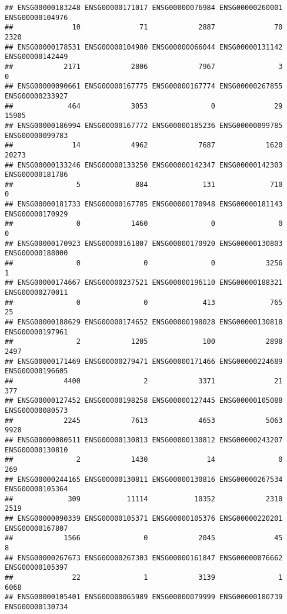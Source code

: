 \documentclass[
]{article}
\begin{document}
\begin{verbatim}
## ENSG00000183248 ENSG00000171017 ENSG00000076984 ENSG00000260001 ENSG00000104976 
##              10              71            2887              70            2320 
## ENSG00000178531 ENSG00000104980 ENSG00000066044 ENSG00000131142 ENSG00000142449 
##            2171            2806            7967               3               0 
## ENSG00000090661 ENSG00000167775 ENSG00000167774 ENSG00000267855 ENSG00000233927 
##             464            3053               0              29           15905 
## ENSG00000186994 ENSG00000167772 ENSG00000185236 ENSG00000099785 ENSG00000099783 
##              14            4962            7687            1620           20273 
## ENSG00000133246 ENSG00000133250 ENSG00000142347 ENSG00000142303 ENSG00000181786 
##               5             884             131             710               0 
## ENSG00000181733 ENSG00000167785 ENSG00000170948 ENSG00000181143 ENSG00000170929 
##               0            1460               0               0               0 
## ENSG00000170923 ENSG00000161807 ENSG00000170920 ENSG00000130803 ENSG00000188000 
##               0               0               0            3256               1 
## ENSG00000174667 ENSG00000237521 ENSG00000196110 ENSG00000188321 ENSG00000270011 
##               0               0             413             765              25 
## ENSG00000188629 ENSG00000174652 ENSG00000198028 ENSG00000130818 ENSG00000197961 
##               2            1205             100            2898            2497 
## ENSG00000171469 ENSG00000279471 ENSG00000171466 ENSG00000224689 ENSG00000196605 
##            4400               2            3371              21             377 
## ENSG00000127452 ENSG00000198258 ENSG00000127445 ENSG00000105088 ENSG00000080573 
##            2245            7613            4653            5063            9928 
## ENSG00000080511 ENSG00000130813 ENSG00000130812 ENSG00000243207 ENSG00000130810 
##               2            1430              14               0             269 
## ENSG00000244165 ENSG00000130811 ENSG00000130816 ENSG00000267534 ENSG00000105364 
##             309           11114           10352            2310            2519 
## ENSG00000090339 ENSG00000105371 ENSG00000105376 ENSG00000220201 ENSG00000167807 
##            1566               0            2045              45               8 
## ENSG00000267673 ENSG00000267303 ENSG00000161847 ENSG00000076662 ENSG00000105397 
##              22               1            3139               1            6068 
## ENSG00000105401 ENSG00000065989 ENSG00000079999 ENSG00000180739 ENSG00000130734 

\end{verbatim}
\end{document}
